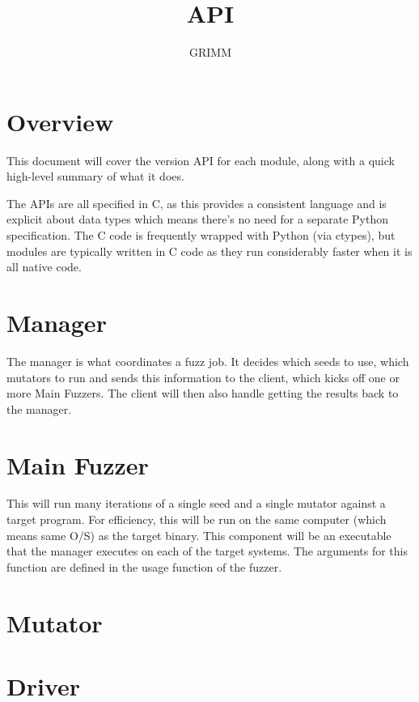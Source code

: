\documentclass{article}
\title{\killerbeez{} API}
\author{GRIMM}
\date{\apiDate{}}
\begin{document}
\thispagestyle{empty}
\maketitle
\newpage

\tableofcontents
\newpage

\section{Overview}
This document will cover the version \apiVersion{} API for each module, along
with a quick high-level summary of what it does.

\par
The APIs are all specified in C, as this provides a consistent language and is
explicit about data types which means there's no need for a separate Python
specification.  The C code is frequently wrapped with Python (via ctypes), but
modules are typically written in C code as they run considerably faster when
it is all native code.

\section{Manager}
The manager is what coordinates a fuzz job.  It decides which seeds to use,
which mutators to run and sends this information to the client, which kicks
off one or more Main Fuzzers.  The client will then also handle getting the
results back to the manager.

\section{Main Fuzzer}
This will run many iterations of a single seed and a single mutator against a
target program.  For efficiency, this will be run on the same computer (which
means same O/S) as the target binary.  This component will be an executable that
the manager executes on each of the target systems.  The arguments for this
function are defined in the usage function of the fuzzer.

\section{Mutator}
\label{mutator}


\section{Driver}
\label{driver}

\end{document}
